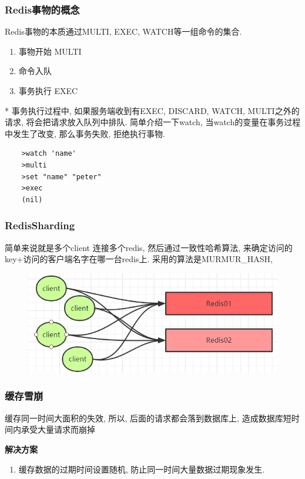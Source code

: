 \documentclass[UTF8]{ctexart}
\begin{document}
	\subsubsection{Redis事物的概念}
	Redis事物的本质通过MULTI, EXEC, WATCH等一组命令的集合. 
	\begin{enumerate}
	
		\item 事物开始 MULTI
		\item 命令入队
		\item 事务执行 EXEC
	\end{enumerate}
* 事务执行过程中, 如果服务端收到有EXEC, DISCARD, WATCH, MULTI之外的请求, 将会把请求放入队列中排队.
简单介绍一下watch, 当watch的变量在事务过程中发生了改变, 那么事务失败, 拒绝执行事物.
\begin{lstlisting}
	>watch 'name'
	>multi
	>set "name" "peter"
	>exec
	(nil)
\end{lstlisting}
\subsubsection{RedisSharding}
简单来说就是多个client 连接多个redis, 然后通过一致性哈希算法, 来确定访问的key+访问的客户端名字在哪一台redis上.
采用的算法是MURMUR\_HASH, 
\begin{figure}
	\centering
	\includegraphics[width=0.7\linewidth]{figures/redis_sharding.png}
	\caption{}
	\label{fig:redissharding}
\end{figure}
\subsubsection{缓存雪崩}
缓存同一时间大面积的失效, 所以, 后面的请求都会落到数据库上, 造成数据库短时间内承受大量请求而崩掉

\par
\textbf{解决方案}
\begin{enumerate}
	
	\item 缓存数据的过期时间设置随机, 防止同一时间大量数据过期现象发生.

\end{enumerate}
\end{document}

